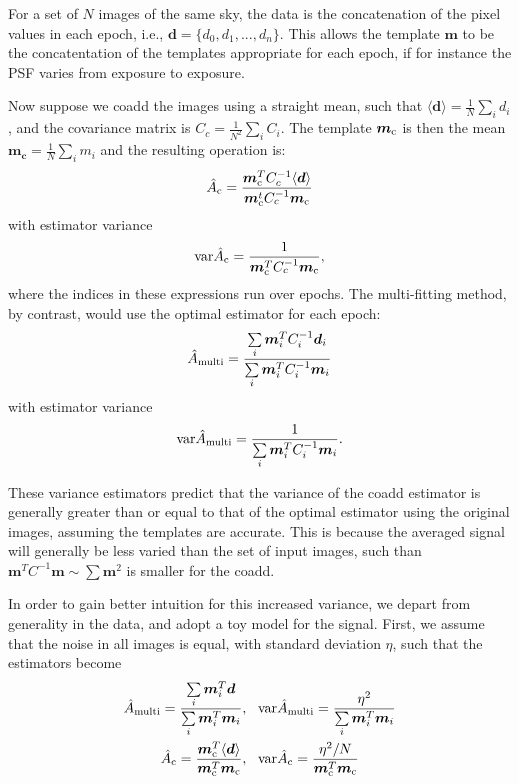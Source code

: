 \documentclass[a4paper,fleqn,usenatbib,referee]{mnras}
\begin{document}
For a set of $N$ images of the same sky, the data is the concatenation of the
pixel values in each epoch, i.e., $\boldsymbol{d} = \{d_0, d_1, ..., d_n \}$.
This allows the template $\boldsymbol{m}$ to be the concatentation of the
templates appropriate for each epoch, if for instance the PSF varies from
exposure to exposure.

Now suppose we coadd the images using a straight mean, such that $\langle
\boldsymbol{d} \rangle = \frac{1}{N}\sum\limits_i d_i$, and the covariance
matrix is $C_c = \frac{1}{N^2}\sum\limits_i C_i$.  The template
$\boldsymbol{m}_{\rm c}$ is then the mean $\boldsymbol{m_c} = \frac{1}{N}\sum\limits_i m_i$
and the resulting operation is:
\begin{align}
    \hat{A}_{\rm c} = \frac{\boldsymbol{m}_{\rm c}^T C_c^{-1} \langle \boldsymbol{d} \rangle}{\boldsymbol{m}_{\rm c}^t C_c^{-1}\boldsymbol{m}_{\rm c}} 
\end{align}
with estimator variance
\begin{align} \label{eq:coaddvarest}
{\rm var}\hat{A}_{\rm c} = \frac{1}{\boldsymbol{m}_{\rm c}^T C_c^{-1}\boldsymbol{m}_{\rm c}},
\end{align}
where the indices in these expressions run over epochs. The multi-fitting
method, by contrast, would use the optimal estimator for each epoch:
\begin{align}
\hat{A}_{\rm multi} = \frac{\sum\limits_i \boldsymbol{m}_i^T C_i^{-1}\boldsymbol{d}_i}{\sum\limits_i \boldsymbol{m}_i^T C_i^{-1}\boldsymbol{m}_i}
\end{align}
with estimator variance
\begin{align}
{\rm var}\hat{A}_{\rm multi} = \frac{1}{\sum\limits_i \boldsymbol{m}_i^T C_i^{-1}\boldsymbol{m}_i}.
\end{align}

These variance estimators predict that the variance of the coadd estimator is
generally greater than or equal to that of the optimal estimator using the
original images, assuming the templates are accurate.  This is because the
averaged signal will generally be less varied than the set of input images,
such than $\boldsymbol{m}^T C^{-1} \boldsymbol{m} \sim \sum \boldsymbol{m}^2$
is smaller for the coadd.

In order to gain better intuition for this increased variance, we depart from
generality in the data, and adopt a toy model for the signal.  First, we assume
that the noise in all images is equal, with standard deviation $\eta$, such
that the estimators become
\begin{align}
    \hat{A}_{\rm multi} = \frac{\sum\limits_i \boldsymbol{m}_i^T \boldsymbol{d}}{\sum\limits_i \boldsymbol{m}_i^T \boldsymbol{m}_i}&, ~~
    {\rm var}\hat{A}_{\rm multi} = \frac{\eta^2}{\sum\limits_i \boldsymbol{m}_i^T \boldsymbol{m}_i}\\
    \hat{A}_{\rm c} = \frac{\boldsymbol{m}_{\rm c}^T \langle \boldsymbol{d} \rangle}{\boldsymbol{m}_{\rm c}^T \boldsymbol{m}_{\rm c}}&, ~~
    {\rm var}\hat{A}_{\rm c} = \frac{\eta^2/N}{\boldsymbol{m}_{\rm c}^T \boldsymbol{m}_{\rm c}}
\end{align}
\end{document}
